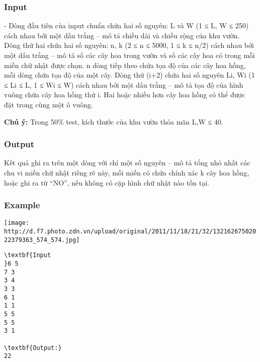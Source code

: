 \subsubsection{Input}

- Dòng đầu tiên của input chuẩn chứa hai số nguyên: L và W (1 ≤ L, W ≤ 250) cách nhau bởi một dấu trắng – mô tả chiều dài và chiều rộng của khu vườn. Dòng thứ hai chứa hai số nguyên: n, k (2 ≤ n ≤ 5000, 1 ≤ k ≤ n/2) cách nhau bởi một dấu trắng – mô tả số các cây hoa trong vườn và số các cây hoa có trong mỗi miền chữ nhật được chọn. n dòng tiếp theo chứa tọa độ của các cây hoa hồng, mỗi dòng chứa tọa độ của một cây. Dòng thứ (i+2) chứa hai số nguyên Li, Wi (1 ≤ Li ≤ L, 1 ≤ Wi ≤ W) cách nhau bởi một dấu trắng – mô tả tọa độ của hình vuông chứa cây hoa hồng thứ i. Hai hoặc nhiều hơn cây hoa hồng có thể được đặt trong cùng một ô vuông.

\textbf{Chú ý: } Trong 50\% test, kích thước của khu vườn thỏa mãn L,W ≤ 40.

\subsubsection{Output}

Kết quả ghi ra trên một dòng với chỉ một số nguyên – mô tả tổng nhỏ nhất các chu vi miền chữ nhật riêng rẽ này, mỗi miền có chứa chính xác k cây hoa hồng, hoặc ghi ra từ “NO”, nếu không có cặp hình chữ nhật nào tồn tại.

\subsubsection{Example}


\texttt{[image: http://d.f7.photo.zdn.vn/upload/original/2011/11/18/21/32/13216267502022379363\_574\_574.jpg]}
\begin{verbatim}
\textbf{Input
}6 5 
7 3 
3 4 
3 3 
6 1 
1 1 
5 5 
5 5 
3 1

\textbf{Output:}
22
\end{verbatim}
